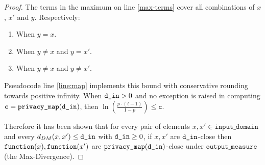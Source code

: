 \documentclass{article}
\begin{document}
\begin{proof}
The terms in the maximum on line \ref{max-terms} cover all combinations of $x$, $x'$ and $y$. Respectively:
\begin{enumerate}
    \item When $y = x$.
    \item When $y \ne x$ and $y = x'$.
    \item When $y \ne x$ and $y \ne x'$.
\end{enumerate}

Pseudocode line \ref{line:map} implements this bound with conservative rounding towards positive infinity. 
When $\texttt{d\_in} > 0$ and no exception is raised in computing $\texttt{c} = \texttt{privacy\_map}(\texttt{d\_in})$, then $\ln\left(\frac{p \cdot (t - 1)}{1 - p}\right) \leq \texttt{c}$. 

Therefore it has been shown that for every pair of elements $x, x' \in \texttt{input\_domain}$ and every $d_{DM}(x, x') \le \texttt{d\_in}$ with $\texttt{d\_in} \ge 0$, 
if $x, x'$ are $\texttt{d\_in}$-close then $\texttt{function}(x),\texttt{function}(x')$ are $\texttt{privacy\_map}(\texttt{d\_in})$-close under $\texttt{output\_measure}$ (the Max-Divergence).
\end{proof}



\end{document}
